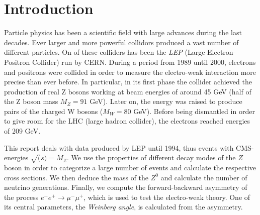 \section{Introduction}

Particle physics has been a scientific field with large advances 
during the last decades. Ever larger and more powerful collidors 
produced a vast number of different particles. On of these colliders 
has been the \emph{LEP} (Large Electron-Positron Collider) run by CERN\@.
During a period from 1989 until 2000, electrons and positrons were 
collided in order to measure the electro-weak interaction more precise 
than ever before. In particular, in its first phase the collider 
achieved the production of real Z bosons working at beam energies of 
around 45 GeV (half of the Z boson mass $M_Z = 91$ GeV). Later on, 
the energy was raised to produce pairs of the charged W bosons 
($M_W = 80$ GeV). Before being dismantled in order to give room 
for the LHC (large hadron collider), the electrons reached energies 
of 209 GeV. 


This report deals with data produced by LEP until 1994, thus events 
with CMS-energies $\sqrt(s) = M_Z$. We use the properties of 
different decay modes of the $Z$ boson in order to categorize a 
large number of events and calculate the respective cross sections. 
We then deduce the mass of the $Z^0$ and calculate the number of 
neutrino generations. Finally, we compute the forward-backward 
asymmetry of the process $e^-e^+ \to \mu^-\mu^+$, which is used 
to test the electro-weak theory. One of its central 
parameters, the \emph{Weinberg angle}, is calculated from the 
asymmetry. 
